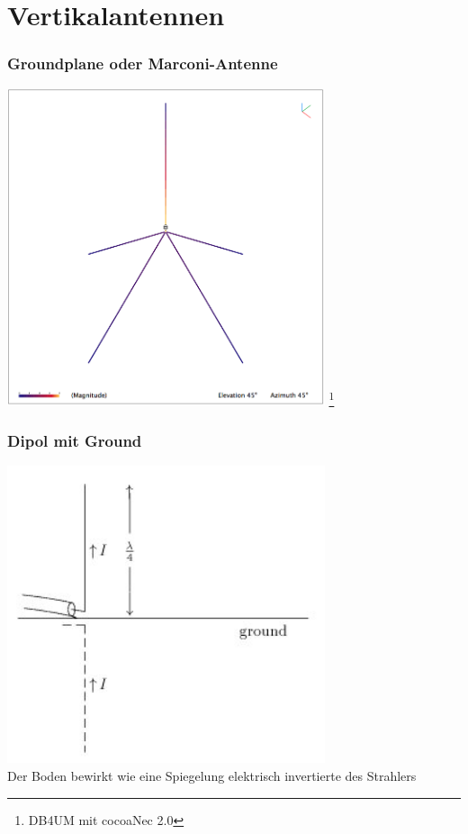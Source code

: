 \section*{Vertikalantennen}

\begin{frame}
    \frametitle{Groundplane oder Marconi-Antenne}
    \begin{center}
        \includegraphics[width=0.7\textwidth]{a09/GP-DB4UM.png}
        \footnote{\tiny DB4UM mit cocoaNec 2.0}
	\end{center}
\end{frame}

\begin{frame}
    \frametitle{Dipol mit Ground}
    \begin{center}
        \includegraphics[width=0.7\textwidth]{a09/A6-3EN.jpg}
        \tiny \hyperlink{refs}{\cite{wm}} \\[2em] \large
        Der Boden bewirkt wie eine Spiegelung elektrisch invertierte des Strahlers
	\end{center}
\end{frame}

